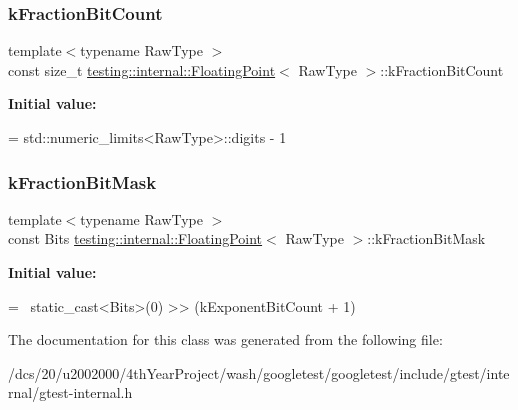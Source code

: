 \subsubsection{\texorpdfstring{k\+Fraction\+Bit\+Count}{kFractionBitCount}}
{\footnotesize\ttfamily template$<$typename Raw\+Type $>$ \\
const size\+\_\+t \mbox{\hyperlink{classtesting_1_1internal_1_1FloatingPoint}{testing\+::internal\+::\+Floating\+Point}}$<$ Raw\+Type $>$\+::k\+Fraction\+Bit\+Count\hspace{0.3cm}{\ttfamily [static]}}

{\bfseries Initial value\+:}
\begin{DoxyCode}
=
      std::numeric\_limits<RawType>::digits - 1
\end{DoxyCode}
\mbox{\label{classtesting_1_1internal_1_1FloatingPoint_a0ac75d4ffd24f14bca452abe8a718da1}} 
\subsubsection{\texorpdfstring{k\+Fraction\+Bit\+Mask}{kFractionBitMask}}
{\footnotesize\ttfamily template$<$typename Raw\+Type $>$ \\
const Bits \mbox{\hyperlink{classtesting_1_1internal_1_1FloatingPoint}{testing\+::internal\+::\+Floating\+Point}}$<$ Raw\+Type $>$\+::k\+Fraction\+Bit\+Mask\hspace{0.3cm}{\ttfamily [static]}}

{\bfseries Initial value\+:}
\begin{DoxyCode}
= ~static\_cast<Bits>(0) >>
                                       (kExponentBitCount + 1)
\end{DoxyCode}


The documentation for this class was generated from the following file\+:\begin{DoxyCompactItemize}
\item 
/dcs/20/u2002000/4th\+Year\+Project/wash/googletest/googletest/include/gtest/internal/gtest-\/internal.\+h\end{DoxyCompactItemize}
